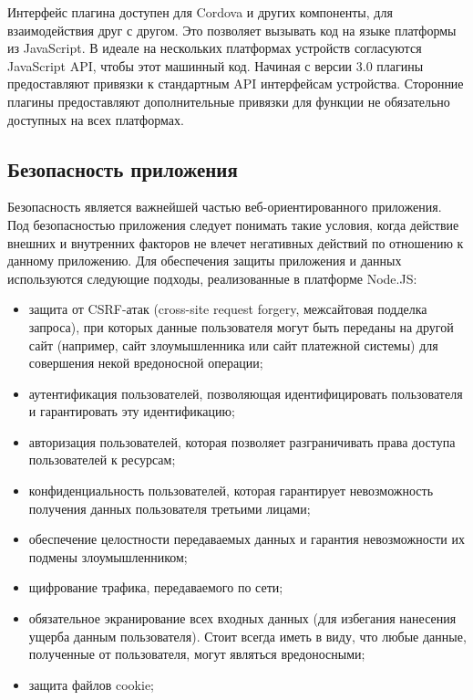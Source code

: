 Интерфейс плагина доступен для Cordova и других компоненты, для взаимодействия друг с другом. Это позволяет вызывать код на языке платформы из JavaScript. В идеале на нескольких платформах устройств согласуются JavaScript API, чтобы этот машинный код. Начиная с версии 3.0 плагины предоставляют привязки к стандартным API интерфейсам устройства. Сторонние плагины предоставляют дополнительные привязки для функции не обязательно доступных на всех платформах.

\subsection{Безопасность приложения}
\label{sub:domain:other_algos3}
Безопасность является важнейшей частью веб-ориентированного приложения. Под безопасностью приложения следует понимать такие условия, когда действие внешних и внутренних факторов не влечет негативных действий по отношению к данному приложению.
Для обеспечения защиты приложения и данных используются следующие подходы, реализованные в платформе Node.JS:
\begin{itemize}
  \item защита от CSRF-атак (cross-site request forgery, межсайтовая подделка запроса), при которых данные пользователя могут быть переданы на другой сайт (например, сайт злоумышленника или сайт платежной системы) для совершения некой вредоносной операции;
  \item аутентификация пользователей, позволяющая идентифицировать пользователя и гарантировать эту идентификацию;
  \item авторизация пользователей, которая позволяет разграничивать права доступа пользователей к ресурсам;
  \item конфиденциальность пользователей, которая гарантирует невозможность получения данных пользователя третьими лицами;
  \item обеспечение целостности передаваемых данных и гарантия невозможности их подмены злоумышленником;
  \item щифрование трафика, передаваемого по сети;
  \item обязательное экранирование всех входных данных (для избегания нанесения ущерба данным пользователя). Стоит всегда иметь в виду, что любые данные, полученные от пользователя, могут являться вредоносными;
  \item защита файлов cookie;
\end{itemize}



